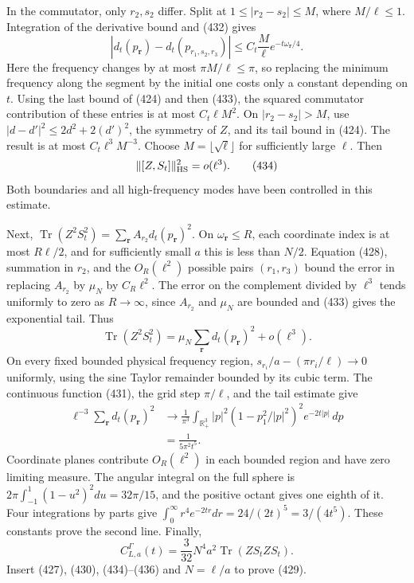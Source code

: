 \documentclass[
  11pt,
]{article}
\begin{document}
In the commutator, only \(r_2,s_2\) differ. Split at
\(1\le |r_2-s_2|\le M\), where \(M/\ell\le1\). Integration of the
derivative bound and (432) gives \[
 |d_t(p_{\boldsymbol r})-d_t(p_{r_1,s_2,r_3})|
       \le C_t\frac M\ell e^{-t\omega_{\boldsymbol r}/4}.
\] Here the frequency changes by at most \(\pi M/\ell\le\pi\), so
replacing the minimum frequency along the segment by the initial one
costs only a constant depending on \(t\). Using the last bound of (424)
and then (433), the squared commutator contribution of these entries is
at most \(C_t\ell M^2\). On \(|r_2-s_2|>M\), use
\(|d-d'|^2\le2d^2+2(d')^2\), the symmetry of \(Z\), and its tail bound
in (424). The result is at most \(C_t\ell^3M^{-3}\). Choose
\(M=\lfloor\sqrt\ell\rfloor\) for sufficiently large \(\ell\). Then \[
 \|[Z,S_t]\|_{\rm HS}^2=o(\ell^3).
 \tag{434}
\] Both boundaries and all high-frequency modes have been controlled in
this estimate.

Next,
\(\operatorname{Tr}(Z^2S_t^2)=\sum_{\boldsymbol r}A_{r_2}d_t(p_{\boldsymbol r})^2\).
On \(\omega_{\boldsymbol r}\le R\), each coordinate index is at most
\(R\ell/2\), and for sufficiently small \(a\) this is less than \(N/2\).
Equation (428), summation in \(r_2\), and the \(O_R(\ell^2)\) possible
pairs \((r_1,r_3)\) bound the error in replacing \(A_{r_2}\) by
\(\mu_N\) by \(C_R\ell^2\). The error on the complement divided by
\(\ell^3\) tends uniformly to zero as \(R\to\infty\), since \(A_{r_2}\)
and \(\mu_N\) are bounded and (433) gives the exponential tail. Thus \[
 \operatorname{Tr}(Z^2S_t^2)
       =\mu_N\sum_{\boldsymbol r}d_t(p_{\boldsymbol r})^2+o(\ell^3).
 \tag{435}
\] On every fixed bounded physical frequency region,
\(s_{r_i}/a-(\pi r_i/\ell)\to0\) uniformly, using the sine Taylor
remainder bounded by its cubic term. The continuous function (431), the
grid step \(\pi/\ell\), and the tail estimate give \[
 \begin{split}
 \ell^{-3}\sum_{\boldsymbol r}d_t(p_{\boldsymbol r})^2
 &\longrightarrow
 \frac1{\pi^3}\int_{\mathbb R_+^3}
     |p|^2(1-p_1^2/|p|^2)^2 e^{-2t|p|}\,dp\\
 &=\frac1{5\pi^2t^5}.
 \end{split}\tag{436}
\] Coordinate planes contribute \(O_R(\ell^2)\) in each bounded region
and have zero limiting measure. The angular integral on the full sphere
is \(2\pi\int_{-1}^1(1-u^2)^2du=32\pi/15\), and the positive octant
gives one eighth of it. Four integrations by parts give
\(\int_0^\infty r^4e^{-2tr}dr=24/(2t)^5=3/(4t^5)\). These constants
prove the second line. Finally, \[
 C^\Gamma_{L,a}(t)
       =\frac3{32}N^4a^2\operatorname{Tr}(ZS_tZS_t).
\] Insert (427), (430), (434)--(436) and \(N=\ell/a\) to prove (429).
\end{document}
